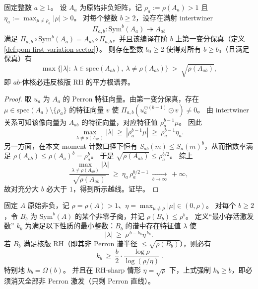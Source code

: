 \begin{theorem}[第一变分保真 \texorpdfstring{$\Rightarrow$}{=>} 高阶核版 RH 不可能：MOM 乘法升级的致命放大]\label{thm:pom-first-variation-fidelity-rh-breaking}
固定整数 \(a\ge 1\)。
设 \(A_a\) 为原始非负矩阵，记 \(\rho_a:=\rho(A_a)>1\) 且 \(\eta_a:=\max_{\mu\ne\rho_a}|\mu|>0\)。
对每个整数 \(b\ge 2\)，设存在满射 intertwiner
\[
\Pi_{a,b}:\mathrm{Sym}^b(A_a)\twoheadrightarrow A_{ab}
\]
满足 \(\Pi_{a,b}\circ \mathrm{Sym}^b(A_a)=A_{ab}\circ \Pi_{a,b}\)，并且该编译在阶 \(b\) 上第一变分保真（定义 \ref{def:pom-first-variation-sector}）。
则存在整数 \(b_0\ge 2\) 使得对所有 \(b\ge b_0\)（且满足保真）有
\[
\max\bigl\{|\lambda|:\ \lambda\in\mathrm{spec}(A_{ab}),\ \lambda\ne\rho(A_{ab})\bigr\}\ >\ \sqrt{\rho(A_{ab})},
\]
即 \(ab\)-体核必违反核版 RH 的平方根谱界。
\end{theorem}
\begin{proof}
取 \(u_a\) 为 \(A_a\) 的 Perron 特征向量。由第一变分保真，存在 \(\mu\in\mathrm{spec}(A_a)\setminus\{\rho_a\}\) 的特征向量 \(v\) 使
\(\Pi_{a,b}(u_a^{\odot(b-1)}\odot v)\ne 0\)。
由 intertwiner 关系可知该像向量为 \(A_{ab}\) 的特征向量，对应特征值 \(\rho_a^{b-1}\mu\)。
因此
\[
\max_{\lambda\ne\rho(A_{ab})}|\lambda|
\ \ge\
|\rho_a^{b-1}\mu|
\ \ge\
\rho_a^{b-1}\eta_a.
\]
另一方面，在本文 moment 计数口径下恒有 \(S_{ab}(m)\le S_a(m)^b\)，从而指数率满足
\(\rho(A_{ab})\le \rho(A_a)^b=\rho_a^b\)。
于是
\(
\sqrt{\rho(A_{ab})}\le \rho_a^{b/2}
\)。
综上
\[
\frac{\max_{\lambda\ne\rho(A_{ab})}|\lambda|}{\sqrt{\rho(A_{ab})}}
\ \ge\
\eta_a\,\rho_a^{b/2-1}\ \xrightarrow[b\to\infty]{}\ +\infty,
\]
故对充分大 \(b\) 必大于 \(1\)，得到所示越线。证毕。
\end{proof}

\begin{theorem}\label{thm:pom-excitation-filter-linear-bound}
固定 \(A\) 原始非负，记 \(\rho=\rho(A)>1\)、\(\eta=\max_{\mu\ne\rho}|\mu|\in(0,\rho)\)。
对每个 \(b\ge 2\)，令 \(B_b\) 为 \(\mathrm{Sym}^b(A)\) 的某个非零子商，并记 \(\rho(B_b)\le \rho^b\)。
定义“最小存活激发数” \(k_b\) 为满足以下性质的最小整数：\(B_b\) 的谱中存在特征值 \(\lambda\) 使
\[
|\lambda|\ \ge\ \rho^{\,b-k_b}\eta^{\,k_b}.
\]
若 \(B_b\) 满足核版 RH（即其非 Perron 谱半径 \(\le \sqrt{\rho(B_b)}\)），则必有
\[
\boxed{\;
k_b\ \ge\ \frac{b}{2}\cdot \frac{\log\rho}{\log(\rho/\eta)}\; }.
\]
特别地 \(k_b=\Omega(b)\)。
并且在 RH-sharp 情形 \(\eta=\sqrt{\rho}\) 下，上式强制 \(k_b\ge b\)，即必须消灭全部非 Perron 激发（只剩 Perron 直线）。
\end{theorem}

